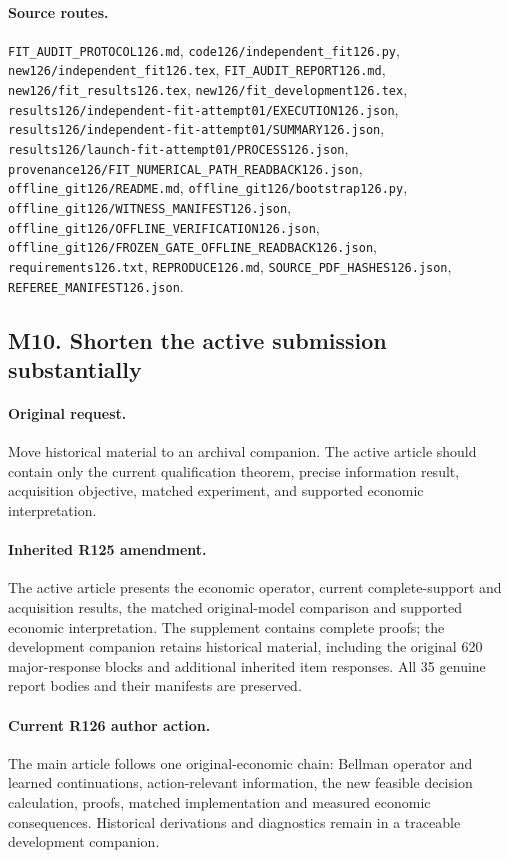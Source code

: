 \paragraph{Source routes.} \nolinkurl{FIT_AUDIT_PROTOCOL126.md}, \nolinkurl{code126/independent_fit126.py}, \nolinkurl{new126/independent_fit126.tex}, \nolinkurl{FIT_AUDIT_REPORT126.md}, \nolinkurl{new126/fit_results126.tex}, \nolinkurl{new126/fit_development126.tex}, \nolinkurl{results126/independent-fit-attempt01/EXECUTION126.json}, \nolinkurl{results126/independent-fit-attempt01/SUMMARY126.json}, \nolinkurl{results126/launch-fit-attempt01/PROCESS126.json}, \nolinkurl{provenance126/FIT_NUMERICAL_PATH_READBACK126.json}, \nolinkurl{offline_git126/README.md}, \nolinkurl{offline_git126/bootstrap126.py}, \nolinkurl{offline_git126/WITNESS_MANIFEST126.json}, \nolinkurl{offline_git126/OFFLINE_VERIFICATION126.json}, \nolinkurl{offline_git126/FROZEN_GATE_OFFLINE_READBACK126.json}, \nolinkurl{requirements126.txt}, \nolinkurl{REPRODUCE126.md}, \nolinkurl{SOURCE_PDF_HASHES126.json}, \nolinkurl{REFEREE_MANIFEST126.json}.

\subsection*{M10. Shorten the active submission substantially}
\paragraph{Original request.} Move historical material to an archival companion. The active article should contain only the current qualification theorem, precise information result, acquisition objective, matched experiment, and supported economic interpretation.

\paragraph{Inherited R125 amendment.} The active article presents the economic operator, current complete-support and acquisition results, the matched original-model comparison and supported economic interpretation. The supplement contains complete proofs; the development companion retains historical material, including the original 620 major-response blocks and additional inherited item responses. All 35 genuine report bodies and their manifests are preserved.

\paragraph{Current R126 author action.} The main article follows one original-economic chain: Bellman operator and learned continuations, action-relevant information, the new feasible decision calculation, proofs, matched implementation and measured economic consequences. Historical derivations and diagnostics remain in a traceable development companion.

